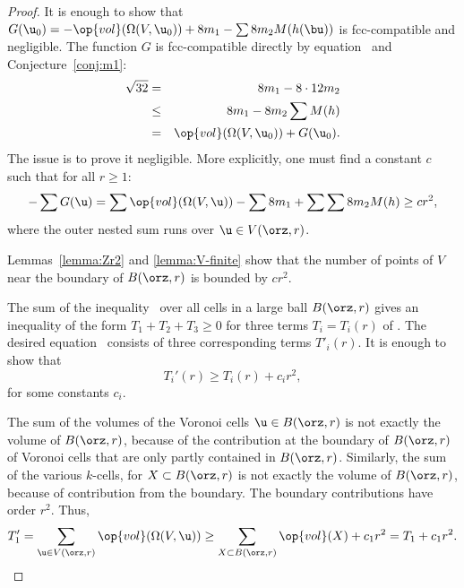 \begin{proof} 
It is enough to show that $G( \u_0) = -\op{vol}(\Omega(V, \u_0)) + 8
m_1 - \sum 8 m_2 M(h(\bu))$ is fcc-compatible and negligible.
The function $G$ is fcc-compatible directly
by equation~
and Conjecture~\ref{conj:m1}:
%
%
\begin{eqnarray*} 
\sqrt{32} &=& 8 m_1 - 8\cdot 12 m_2\\
&\le& 8 m_1 - 8 m_2 \sum M(h)\\
&=& \op{vol}(\Omega(V, \u_0)) + G( \u_0).
\end{eqnarray*}
The issue is to prove it negligible.  More explicitly, one must find a
constant $c$ such that for all $r\ge 1$:%
\begin{equation}\label{eqn:neg} 
-\sum G( \u) = \sum \op{vol}(\Omega(V, \u)) 
-\sum 8m_1 + \sum \sum 8 m_2 M(h) \ge c r^2,
\end{equation}
where the outer nested sum runs over $ \u\in  V(\orz,r)$.

Lemmas~\ref{lemma:Zr2} and \ref{lemma:V-finite} show that the number
of points of $ V$ near the boundary of $B(\orz,r)$ is bounded by $c
r^2$.


The sum of the inequality~ over all cells in a large ball
$B(\orz,r)$ gives an inequality of the form $T_1 + T_2 + T_3\ge 0$ for
three terms $T_i = T_i(r)$ of .  The desired
equation~ consists of three corresponding terms
$T'_i(r)$.  It is enough to show that
\begin{displaymath} 
T_i'(r) \ge T_i(r) + c_i r^2,
\end{displaymath}
for some constants $c_i$.

The sum of the volumes of the Voronoi cells $ \u\in B(\orz,r)$ is not
exactly the volume of $B(\orz,r)$, because of the contribution at the
boundary of $B(\orz,r)$ of Voronoi cells that are only partly contained
in $B(\orz,r)$.  Similarly, the sum of the various $k$-cells, for
$X\subset B(\orz,r)$ is not exactly the volume of $B(\orz,r)$, because of
contribution from the boundary. The boundary contributions have order
$r^2$. Thus,
\begin{displaymath} 
T_1'= \sum_{ \u\in  V(\orz,r)} \op{vol}(\Omega(V, \u)) 
\ge \sum_{X\subset B(\orz,r)} \op{vol}(X) + c_1 r^2 = T_1 + c_1 r^2.
\end{displaymath}



\end{proof}
